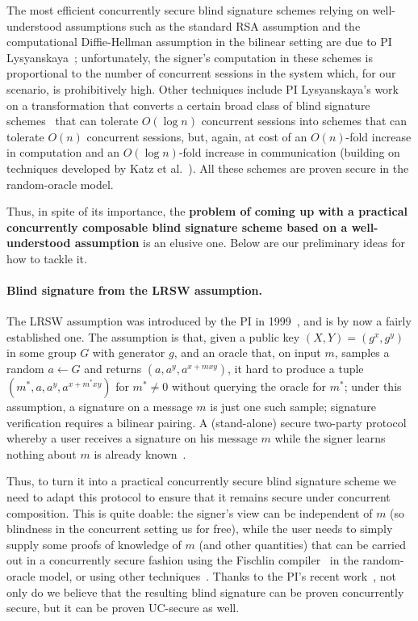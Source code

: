 The most efficient concurrently secure blind signature schemes relying on well-understood assumptions such as the standard RSA assumption and the computational Diffie-Hellman assumption in the bilinear setting are due to PI Lysyanskaya~\cite{chllw22}; unfortunately, the signer's computation in these schemes is proportional to the number of concurrent sessions in the system which, for our scenario, is prohibitively high. 
Other techniques include PI Lysyanskaya's work~\cite{chllw22} on a transformation that converts a certain broad class of blind signature schemes~\cite{EC:HauKilLos19} that can tolerate $O(\log n)$ concurrent sessions into schemes that can tolerate $O(n)$ concurrent sessions, but, again, at cost of an $O(n)$-fold increase in computation and an $O(\log n)$-fold increase in communication (building on techniques developed by Katz et al.~\cite{AC:KatLosRos21}).  All these schemes are proven secure in the random-oracle model.

Thus, in spite of its importance, the \textbf{problem of coming up with a practical concurrently composable blind signature scheme based on a well-understood assumption} is an elusive one.  Below are our preliminary ideas for how to tackle it.

\paragraph{Blind signature from the LRSW assumption.} The LRSW assumption was introduced by the PI in 1999~\cite{lrsw99,lysyan99}, and is by now a fairly established one.  The assumption is that, given a public key $(X,Y)= (g^x,g^y)$ in some group $G$ with generator $g$, and an oracle that, on input $m$, samples a random $a\leftarrow G$ and returns $(a,a^y,a^{x+mxy})$, it hard to produce a tuple $(m^*,a,a^y,a^{x+m^*xy})$ for $m^*\neq 0$ without querying the oracle for $m^*$; under this assumption, a signature on a message $m$ is just one such sample; signature verification requires a bilinear pairing.  A (stand-alone) secure two-party protocol whereby a user receives a signature on his message $m$ while the signer learns nothing about $m$ is already known~\cite{C:CamLys04}.  

Thus, to turn it into a practical concurrently secure blind signature scheme we need to adapt this protocol to ensure that it remains secure under concurrent composition.  This is quite doable: the signer's view can be independent of $m$ (so blindness in the concurrent setting us for free), while the user needs to simply supply some proofs of knowledge of $m$ (and other quantities) that can be carried out in a concurrently secure fashion using the Fischlin compiler~\cite{C:Fischlin05} in the random-oracle model, or using other techniques~\cite{AC:CamDam00,C:CamSho03}. Thanks to the PI's recent work~\cite{lysros22}, not only do we believe that the resulting blind signature can be proven concurrently secure, but it can be proven UC-secure as well. 

